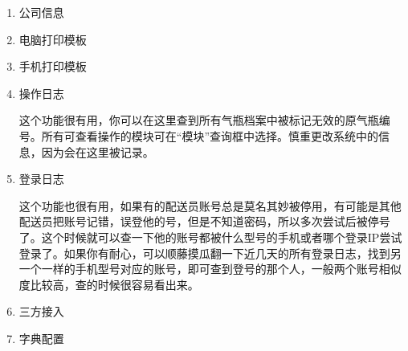 \documentclass[UTF8]{ctexart}
\begin{document}
\begin{enumerate}
	\item 公司信息
	
	\item 电脑打印模板
	
	\item 手机打印模板
	
	\item 操作日志
	
	这个功能很有用，你可以在这里查到所有气瓶档案中被标记无效的原气瓶编号。所有可查看操作的模块可在“模块”查询框中选择。慎重更改系统中的信息，因为会在这里被记录。
	
	\item 登录日志
	
	这个功能也很有用，如果有的配送员账号总是莫名其妙被停用，有可能是其他配送员把账号记错，误登他的号，但是不知道密码，所以多次尝试后被停号了。这个时候就可以查一下他的账号都被什么型号的手机或者哪个登录IP尝试登录了。如果你有耐心，可以顺藤摸瓜翻一下近几天的所有登录日志，找到另一个一样的手机型号对应的账号，即可查到登号的那个人，一般两个账号相似度比较高，查的时候很容易看出来。
	
	\item 三方接入
	
	\item 字典配置
	
\end{enumerate}
\end{document}
